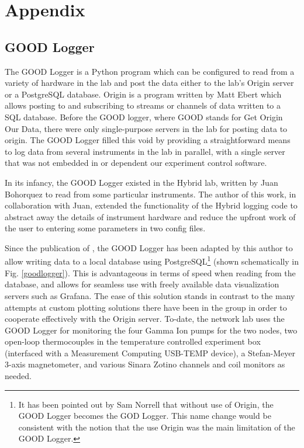 \part{Appendix}\label{part:appendices}
\chapter{GOOD Logger}\label{ch:template}

The GOOD Logger is a Python program which can be configured to read from a variety of hardware in the lab and post the data either to the lab's Origin server or a PostgreSQL database. Origin is a program written by Matt Ebert which allows posting to and subscribing to streams or channels of data written to a SQL database. Before the GOOD logger, where GOOD stands for Get Origin Our Data, there were only single-purpose servers in the lab for posting data to origin. The GOOD Logger filled this void by providing a straightforward means to log data from several instruments in the lab in parallel, with a single server that was not embedded in or dependent our experiment control software. 

In its infancy, the GOOD Logger existed in the Hybrid lab, written by Juan Bohorquez to read from some particular instruments. The author of this work, in collaboration with Juan, extended the functionality of the Hybrid logging code to abstract away the details of instrument hardware and reduce the upfront work of the user to entering some parameters in two config files.

Since the publication of \cite{Bohorquez2023}, the GOOD Logger has been adapted by this author to allow writing data to a local database using PostgreSQL\footnote{It has been pointed out by Sam Norrell that without use of Origin, the GOOD Logger becomes the GOD Logger. This name change would be consistent with the notion that the use Origin was the main limitation of the GOOD Logger.} (shown schematically in Fig. \ref{goodlogger}). This is advantageous in terms of speed when reading from the database, and allows for seamless use with freely available data visualization servers such as Grafana. The ease of this solution stands in contrast to the many attempts at custom plotting solutions there have been in the group in order to cooperate effectively with the Origin server. To-date, the network lab uses the GOOD Logger for monitoring the four Gamma Ion pumps for the two nodes, two open-loop thermocouples in the temperature controlled experiment box (interfaced with a Measurement Computing USB-TEMP device), a Stefan-Meyer 3-axis magnetometer, and various Sinara Zotino channels and coil monitors as needed.

